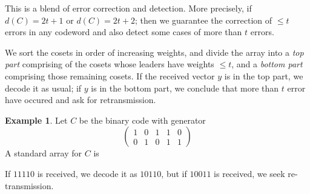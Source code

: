 \documentclass[11pt,a4paper]{article}
\theoremstyle{definition}
\newtheorem{example}[definition]{Example}
\theoremstyle{plain}
\theoremstyle{remark}
\begin{document}
This is a blend of error correction and detection. More precisely, if $d(C) = 2t + 1$ or $d(C) = 2t + 2$; 
then we guarantee the correction of $\leq t$ errors in any codeword and also detect some cases of more than $t$ errors. 

We sort the cosets in order of increasing weights, and divide the array into a 
\emph{top part} comprising of the cosets whose leaders have weights $\leq t$, and a \emph{bottom part} comprising those remaining cosets. 
If the received vector $y$ is in the top part, we decode it as usual; if $y$ is in the bottom part, we conclude that more than $t$ error have occured and ask for retransmission. 

\begin{example}
    Let $C$ be the binary code with generator 
    $$ \begin{pmatrix}
        1 & 0 & 1 & 1 & 0 \\
        0 & 1 & 0 & 1 & 1
    \end{pmatrix}$$
    A standard array for $C$ is 
    \center
    If $11110$ is received, we decode it as $10110$, but if $10011$ is received, we seek re-transmission. 
\end{example}
\end{document}
